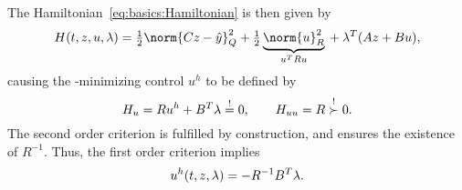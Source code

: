 The Hamiltonian~\eqref{eq:basics:Hamiltonian} is then given by
\begin{equation*}
  \Ham(t,z,u,\lambda) =
  \onehalf \norm{Cz - \hat y}_Q^2 +
  \onehalf \underbrace{
    \norm{u}_R^2
  }_{u^\T R u}
  {} +
  \lambda^\T (Az + Bu)
  ,
\end{equation*}
causing the \Ham-minimizing control $u^h$ to be defined by
\begin{equation*}
  H_u = Ru^h + B^T \lambda \overset{!}{=} 0,
  \qquad
  H_{uu} = R \overset{!}{\succ} 0.
\end{equation*}
The second order criterion is fulfilled by construction,
and ensures the existence of $R^{-1}$.
Thus, the first order criterion implies
\begin{equation}
\label{eq:basics:LQR:uh}
  u^h(t, z, \lambda) = -R^{-1} B^T \lambda
  .
\end{equation}

